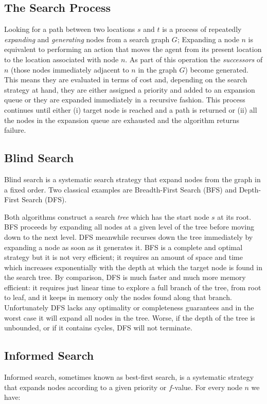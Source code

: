 \subsection{The Search Process}
\label{cha::lit::search:terms}
Looking for a path between two locations $s$ and $t$ is a process of repeatedly
\emph{expanding} and \emph{generating} nodes from a search graph $G$; 
Expanding a node $n$ is equivalent to performing an action that moves the agent 
from its present location to the location associated with node $n$.
As part of this operation the \emph{successors} of $n$ (those nodes immediately 
adjacent to $n$ in the graph $G$) become generated. This means they are evaluated 
in terms of cost and, depending on the search strategy at hand, they are either
assigned a priority and added to an expansion queue or they are expanded
immediately in a recursive fashion.  This process continues until either (i)
target node is reached and a path is returned or (ii) all the nodes in the
expansion queue are exhausted and the algorithm returns failure.

\subsection{Blind Search}
\label{cha::lit::search::blind}
Blind search is a systematic search strategy that expand nodes from the 
graph in a fixed order. Two classical examples are Breadth-First Search (BFS) and 
Depth-First Search (DFS). 

Both algorithms construct a search \emph{tree} which has the start node $s$ at its root. 
BFS proceeds by expanding all nodes at a given level of the tree
before moving down to the next level. DFS meanwhile recurses down the tree immediately 
by expanding a node as soon as it generates it.
BFS is a complete and optimal strategy but it is not very efficient; it requires
an amount of space and time which increases exponentially with the depth at which 
the target node is found in the search tree.
By comparison, DFS is much faster and much more memory efficient: it requires just
linear time to explore a full branch of the tree, from root to leaf, and it keeps in 
memory only the nodes found along that branch. Unfortunately DFS lacks any optimality or 
completeness guarantees and in the worst case it will expand all nodes in the tree.
Worse, if the depth of the tree is unbounded, or if it contains cycles, 
DFS will not terminate.

\subsection{Informed Search}
\label{cha::lit::search::informed}
Informed search, sometimes known as best-first search, is a systematic strategy
that expands nodes according to a given priority or $f$-value. 
For every node $n$ we have:

